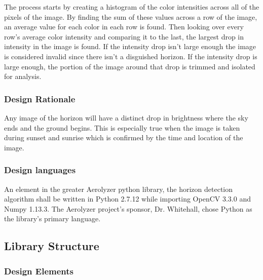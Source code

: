 \documentclass[onecolumn, draftclsnofoot,10pt, compsoc]{IEEEtran}
\begin{document}
\begin{singlespace}
		The process starts by creating a histogram of the color intensities across all of the pixels of the image.
		By finding the sum of these values across a row of the image, an average value for each color in each row is found.
		Then looking over every row's average color intensity and comparing it to the last, the largest drop in intensity in the image is found.
		If the intensity drop isn't large enough the image is considered invalid since there isn't a disguished horizon.
		If the intensity drop is large enough, the portion of the image around that drop is trimmed and isolated for analysis.

      \subsubsection{Design Rationale}
		Any image of the horizon will have a distinct drop in brightness where the sky ends and the ground begins.
		This is especially true when the image is taken during sunset and sunrise which is confirmed by the time and location of the image.

      \subsubsection{Design languages}
      	An element in the greater Aerolyzer python library, the horizon detection algorithm shall be written in Python 2.7.12 while importing OpenCV 3.3.0 and Numpy 1.13.3. The Aerolyzer project’s sponsor, Dr. Whitehall, chose Python as the library’s primary language. 

	\subsection{Library Structure}\label{des:LibStructure}
      \subsubsection{Design Elements}

\end{singlespace}
\end{document}
